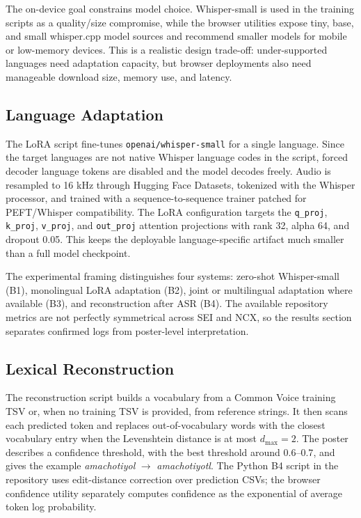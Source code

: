 \documentclass[11pt]{article}
\begin{document}
The on-device goal constrains model choice. Whisper-small is used in the training scripts as a quality/size compromise, while the browser utilities expose tiny, base, and small whisper.cpp model sources and recommend smaller models for mobile or low-memory devices. This is a realistic design trade-off: under-supported languages need adaptation capacity, but browser deployments also need manageable download size, memory use, and latency.

\subsection{Language Adaptation}

The LoRA script fine-tunes \texttt{openai/whisper-small} for a single language. Since the target languages are not native Whisper language codes in the script, forced decoder language tokens are disabled and the model decodes freely. Audio is resampled to 16 kHz through Hugging Face Datasets, tokenized with the Whisper processor, and trained with a sequence-to-sequence trainer patched for PEFT/Whisper compatibility. The LoRA configuration targets the \texttt{q\_proj}, \texttt{k\_proj}, \texttt{v\_proj}, and \texttt{out\_proj} attention projections with rank 32, alpha 64, and dropout 0.05. This keeps the deployable language-specific artifact much smaller than a full model checkpoint.

The experimental framing distinguishes four systems: zero-shot Whisper-small (B1), monolingual LoRA adaptation (B2), joint or multilingual adaptation where available (B3), and reconstruction after ASR (B4). The available repository metrics are not perfectly symmetrical across SEI and NCX, so the results section separates confirmed logs from poster-level interpretation.

\subsection{Lexical Reconstruction}

The reconstruction script builds a vocabulary from a Common Voice training TSV or, when no training TSV is provided, from reference strings. It then scans each predicted token and replaces out-of-vocabulary words with the closest vocabulary entry when the Levenshtein distance is at most $d_{\max}=2$. The poster describes a confidence threshold, with the best threshold around $0.6$--$0.7$, and gives the example \textit{amachotiyol} $\rightarrow$ \textit{amachotiyotl}. The Python B4 script in the repository uses edit-distance correction over prediction CSVs; the browser confidence utility separately computes confidence as the exponential of average token log probability.
\end{document}
